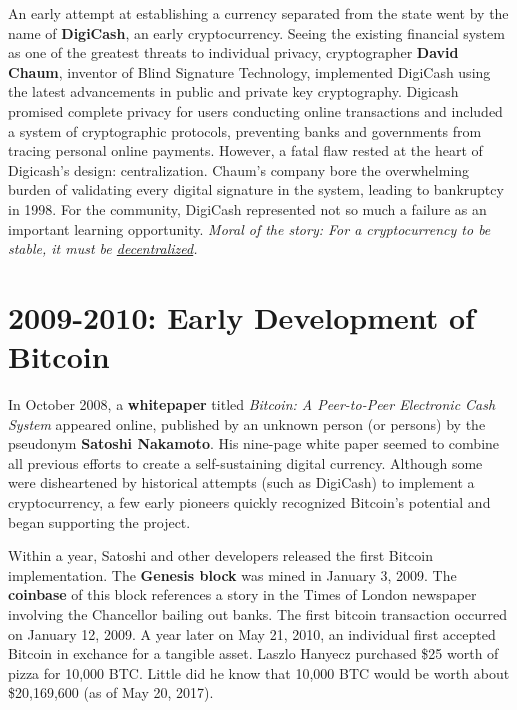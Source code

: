 \documentclass[full.tex]{subfiles}
\begin{document}
    An early attempt at establishing a currency separated from the state went by the name of \textbf{DigiCash}, an early cryptocurrency. Seeing the existing financial system as one of the greatest threats to individual privacy, cryptographer \textbf{David Chaum}, inventor of Blind Signature Technology, implemented DigiCash using the latest advancements in public and private key cryptography. Digicash promised complete privacy for users conducting online transactions and included a system of cryptographic protocols, preventing banks and governments from tracing personal online payments. However, a fatal flaw rested at the heart of Digicash's design: centralization. Chaum's company bore the overwhelming burden of validating every digital signature in the system, leading to bankruptcy in 1998. For the community, DigiCash represented not so much a failure as an important learning opportunity. \textit{Moral of the story: For a cryptocurrency to be stable, it must be \underline{decentralized}.}
    
    \section*{2009-2010: Early Development of Bitcoin}
    
    In October 2008, a \textbf{whitepaper} titled \textit{Bitcoin: A Peer-to-Peer Electronic Cash System} appeared online, published by an unknown person (or persons) by the pseudonym \textbf{Satoshi Nakamoto}. His nine-page white paper seemed to combine all previous efforts to create a self-sustaining digital currency. Although some were disheartened by historical attempts (such as DigiCash) to implement a cryptocurrency, a few early pioneers quickly recognized Bitcoin's potential and began supporting the project.
    
    Within a year, Satoshi and other developers released the first Bitcoin implementation. The \textbf{Genesis block} was mined in January 3, 2009. The \textbf{coinbase} of this block references a story in the Times of London newspaper involving the Chancellor bailing out banks. The first bitcoin transaction occurred on January 12, 2009. A year later on May 21, 2010, an individual first accepted Bitcoin in exchance for a tangible asset. Laszlo Hanyecz purchased \$25 worth of pizza for 10,000 BTC. Little did he know that 10,000 BTC would be worth about \$20,169,600 (as of May 20, 2017).
\end{document}
